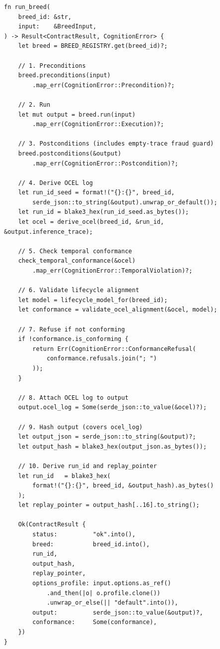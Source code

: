 \begin{verbatim}
fn run_breed(
    breed_id: &str,
    input:    &BreedInput,
) -> Result<ContractResult, CognitionError> {
    let breed = BREED_REGISTRY.get(breed_id)?;

    // 1. Preconditions
    breed.preconditions(input)
        .map_err(CognitionError::Precondition)?;

    // 2. Run
    let mut output = breed.run(input)
        .map_err(CognitionError::Execution)?;

    // 3. Postconditions (includes empty-trace fraud guard)
    breed.postconditions(&output)
        .map_err(CognitionError::Postcondition)?;

    // 4. Derive OCEL log
    let run_id_seed = format!("{}:{}", breed_id,
        serde_json::to_string(&output).unwrap_or_default());
    let run_id = blake3_hex(run_id_seed.as_bytes());
    let ocel = derive_ocel(breed_id, &run_id, &output.inference_trace);

    // 5. Check temporal conformance
    check_temporal_conformance(&ocel)
        .map_err(CognitionError::TemporalViolation)?;

    // 6. Validate lifecycle alignment
    let model = lifecycle_model_for(breed_id);
    let conformance = validate_ocel_alignment(&ocel, model);

    // 7. Refuse if not conforming
    if !conformance.is_conforming {
        return Err(CognitionError::ConformanceRefusal(
            conformance.refusals.join("; ")
        ));
    }

    // 8. Attach OCEL log to output
    output.ocel_log = Some(serde_json::to_value(&ocel)?);

    // 9. Hash output (covers ocel_log)
    let output_json = serde_json::to_string(&output)?;
    let output_hash = blake3_hex(output_json.as_bytes());

    // 10. Derive run_id and replay_pointer
    let run_id   = blake3_hex(
        format!("{}:{}", breed_id, &output_hash).as_bytes()
    );
    let replay_pointer = output_hash[..16].to_string();

    Ok(ContractResult {
        status:          "ok".into(),
        breed:           breed_id.into(),
        run_id,
        output_hash,
        replay_pointer,
        options_profile: input.options.as_ref()
            .and_then(|o| o.profile.clone())
            .unwrap_or_else(|| "default".into()),
        output:          serde_json::to_value(&output)?,
        conformance:     Some(conformance),
    })
}
\end{verbatim}

